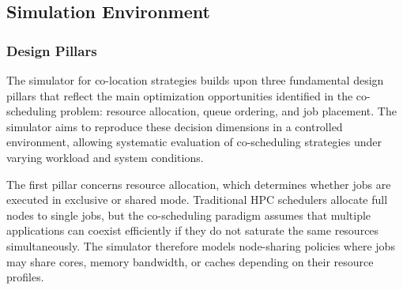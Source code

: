 \subsection{Simulation Environment}
\label{sec:simulation_environment}

\subsubsection{Design Pillars}
\label{sec:design_pillars}
The simulator for co-location strategies builds upon three fundamental design pillars that reflect the main optimization opportunities identified in the co-scheduling problem: resource allocation, queue ordering, and job placement. The simulator aims to reproduce these decision dimensions in a controlled environment, allowing systematic evaluation of co-scheduling strategies under varying workload and system conditions.

The first pillar concerns resource allocation, which determines whether jobs are executed in exclusive or shared mode. Traditional HPC schedulers allocate full nodes to single jobs, but the co-scheduling paradigm assumes that multiple applications can coexist efficiently if they do not saturate the same resources simultaneously. The simulator therefore models node-sharing policies where jobs may share cores, memory bandwidth, or caches depending on their resource profiles.

